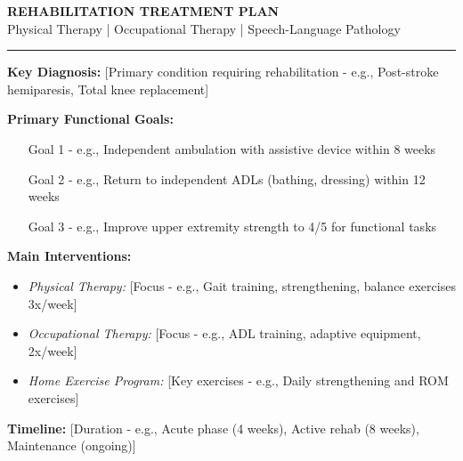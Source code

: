 \documentclass[11pt,letterpaper]{article}
\begin{document}
\begin{center}
{\Large\bfseries REHABILITATION TREATMENT PLAN}\\[0.5em]
{\large Physical Therapy | Occupational Therapy | Speech-Language Pathology}\\[0.5em]
\rule{\textwidth}{1pt}
\end{center}

\vspace{1em}

\begin{tcolorbox}[colback=green!5!white,colframe=green!75!black,title=\textbf{TREATMENT PLAN HIGHLIGHTS},fonttitle=\bfseries\large]

\textbf{Key Diagnosis:} [Primary condition requiring rehabilitation - e.g., Post-stroke hemiparesis, Total knee replacement]

\vspace{0.3em}
\textbf{Primary Functional Goals:}
\begin{itemize}[leftmargin=*,itemsep=0pt]
    \item [Goal 1 - e.g., Independent ambulation with assistive device within 8 weeks]
    \item [Goal 2 - e.g., Return to independent ADLs (bathing, dressing) within 12 weeks]
    \item [Goal 3 - e.g., Improve upper extremity strength to 4/5 for functional tasks]
\end{itemize}

\vspace{0.3em}
\textbf{Main Interventions:}
\begin{itemize}[leftmargin=*,itemsep=0pt]
    \item \textit{Physical Therapy:} [Focus - e.g., Gait training, strengthening, balance exercises 3x/week]
    \item \textit{Occupational Therapy:} [Focus - e.g., ADL training, adaptive equipment, 2x/week]
    \item \textit{Home Exercise Program:} [Key exercises - e.g., Daily strengthening and ROM exercises]
\end{itemize}

\vspace{0.3em}
\textbf{Timeline:} [Duration - e.g., Acute phase (4 weeks), Active rehab (8 weeks), Maintenance (ongoing)]

\end{tcolorbox}

\vspace{1em}
\end{document}
